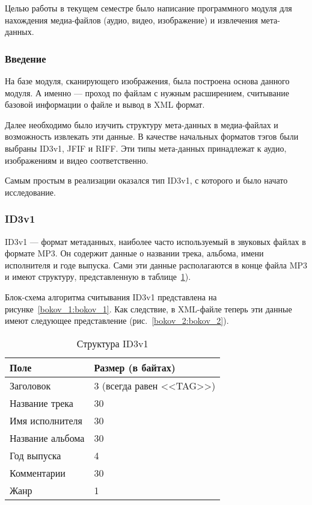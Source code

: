 Целью работы в текущем семестре было написание программного модуля для нахождения медиа-файлов (аудио, видео, изображение) и извлечения мета-данных.

\subsubsection{Введение}

На базе модуля, сканирующего изображения, была построена основа данного модуля. А именно --- проход по файлам с нужным расширением, считывание базовой информации о файле и вывод в XML формат.

Далее необходимо было изучить структуру мета-данных в медиа-файлах и возможность извлекать эти данные. В качестве начальных форматов тэгов были выбраны ID3v1, JFIF и RIFF. Эти типы мета-данных принадлежат к аудио, изображениям и видео соответственно.

Самым простым в реализации оказался тип ID3v1, с которого и было начато исследование.

\subsubsection{ID3v1}

ID3v1 --- формат метаданных, наиболее часто используемый в звуковых файлах в формате MP3. Он содержит данные о названии трека, альбома, имени исполнителя и годе выпуска. Сами эти данные располагаются в конце файла MP3 и имеют структуру, представленную в таблице~\ref{tab:id3v1}).

Блок-схема алгоритма считывания ID3v1 представлена на рисунке~\ref{bokov_1:bokov_1}. Как следствие, в XML-файле теперь эти данные имеют следующее представление (рис.~\ref{bokov_2:bokov_2}).

\begin{table}[ht]
\caption{Структура ID3v1}
\label{tab:id3v1}
\begin{center}
\begin{tabularx}{\linewidth}{|l|X|}
\hline
Поле & Размер (в байтах) \\
\hline
Заголовок & 3 (всегда равен <<TAG>>) \\
\hline
Название трека & 30 \\
\hline
Имя исполнителя & 30 \\
\hline
Название альбома & 30 \\
\hline
Год выпуска & 4 \\
\hline
Комментарии & 30 \\
\hline
Жанр & 1 \\
\hline
\end{tabularx}
\end{center}
\end{table}

